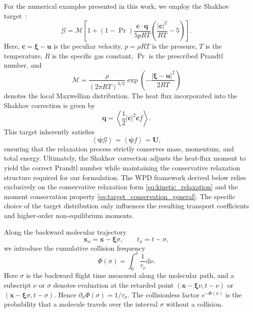 \documentclass[preprint,12pt]{elsarticle}
\begin{document}
For the numerical examples presented in this work, we employ the Shakhov target~\cite{shakhov1968}:
\begin{equation}\label{eq:shakhov_target}
    \mathcal{G} = \mathcal{M} \left[ 1 + (1-\Pr)\frac{\boldsymbol{c} \cdot \boldsymbol{q}}{5pRT} \left(\frac{|\boldsymbol{c}|^2}{RT}-5\right) \right].
\end{equation}
Here, \(\boldsymbol{c} = \boldsymbol{\xi} - \boldsymbol{u}\) is the peculiar velocity, \(p = \rho R T\) is the pressure, \(T\) is the temperature, \(R\) is the specific gas constant, \(\Pr\) is the prescribed Prandtl number, and
\begin{equation}\label{eq:maxwellian}
    \mathcal{M} = \frac{\rho}{(2\pi RT)^{3/2}} \exp\left(-\frac{|\boldsymbol{\xi}-\boldsymbol{u}|^2}{2RT}\right)
\end{equation}
denotes the local Maxwellian distribution. The heat flux incorporated into the Shakhov correction is given by
\begin{equation}\label{eq:heat_flux_def}
    \boldsymbol{q} = \left\langle \frac{1}{2}|\boldsymbol{c}|^2\boldsymbol{c} f \right\rangle.
\end{equation}
This target inherently satisfies
\begin{equation}\label{eq:shakhov_conservation}
    \left\langle \boldsymbol{\psi}\mathcal{G} \right\rangle = \left\langle \boldsymbol{\psi}f \right\rangle = \mathbf{U},
\end{equation}
ensuring that the relaxation process strictly conserves mass, momentum, and total energy. Ultimately, the Shakhov correction adjusts the heat-flux moment to yield the correct Prandtl number while maintaining the conservative relaxation structure required for our formulation. The WPD framework derived below relies exclusively on the conservative relaxation form \eqref{eq:kinetic_relaxation} and the moment conservation property \eqref{eq:target_conservation_general}. The specific choice of the target distribution only influences the resulting transport coefficients and higher-order non-equilibrium moments.



Along the backward molecular trajectory
\begin{equation}
    \boldsymbol{x}_\sigma=\boldsymbol{x}-\boldsymbol{\xi}\sigma,\qquad t_\sigma=t-\sigma,
\end{equation}
we introduce the cumulative collision frequency
\begin{equation}\label{eq:Phi_def}
    \Phi(\sigma) = \int_0^{\sigma} \frac{1}{\tau_\nu} \mathrm{d}\nu.
\end{equation}
Here $\sigma$ is the backward flight time measured along the molecular path, and a subscript $\nu$ or $\sigma$ denotes evaluation at the retarded point $(\boldsymbol{x}-\boldsymbol{\xi}\nu,t-\nu)$ or $(\boldsymbol{x}-\boldsymbol{\xi}\sigma,t-\sigma)$. Hence $\partial_\sigma\Phi(\sigma)=1/\tau_\sigma$. The collisionless factor $e^{-\Phi(\sigma)}$ is the probability that a molecule travels over the interval $\sigma$ without a collision.
\end{document}

